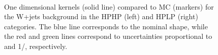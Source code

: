 \begin{figure}[h]
\centering
{}
\\
\caption{One dimensional \MVV kernels (solid line) compared to MC (markers) for the W+jets background in the HPHP (left) and HPLP (right) categories. The blue line corresponds to the nominal shape, while the red and green lines correspond to uncertainties proportional to \MVV and 1/\MVV, respectively.}
\label{fig:Vjets_mvv}
\end{figure}
